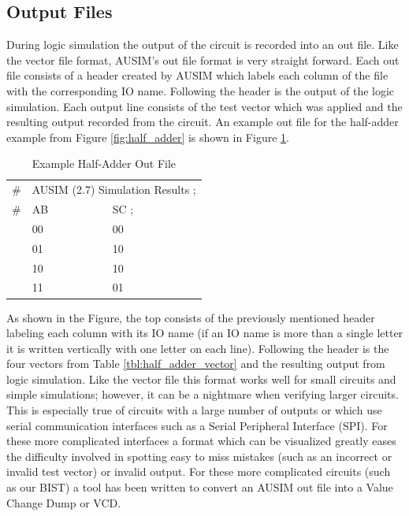 \documentclass[12pt]{report}
\begin{document}
\subsection{Output Files}
During logic simulation the output of the circuit is recorded into an out file.  Like the vector file format, AUSIM's out file format is very straight forward.  Each out file consists of a header created by AUSIM which labels each column of the file with the corresponding IO name.  Following the header is the output of the logic simulation.  Each output line consists of the test vector which was applied and the resulting output recorded from the circuit.  An example out file for the half-adder example from Figure \ref{fig:half_adder} is shown in Figure \ref{tbl:half_adder_out}.
\begin{table}
	\begin{center}
		\begin{tabular}{lll}
			\# & \multicolumn{2}{l}{AUSIM (2.7) Simulation Results ;} \\
			\# & AB & SC ; \\
			   & 00 & 00 \\
			   & 01 & 10 \\
			   & 10 & 10 \\
			   & 11 & 01 \\
		\end{tabular}
	\end{center}
	\caption{Example Half-Adder Out File}
	\label{tbl:half_adder_out}
\end{table}
As shown in the Figure, the top consists of the previously mentioned header labeling each column with its IO name (if an IO name is more than a single letter it is written vertically with one letter on each line).  Following the header is the four vectors from Table \ref{tbl:half_adder_vector} and the resulting output from logic simulation.  Like the vector file this format works well for small circuits and simple simulations; however, it can be a nightmare when verifying larger circuits.  This is especially true of circuits with a large number of outputs or which use serial communication interfaces such as a Serial Peripheral Interface (SPI).  For these more complicated interfaces a format which can be visualized greatly eases the difficulty involved in spotting easy to miss mistakes (such as an incorrect or invalid test vector) or invalid output.  For these more complicated circuits (such as our BIST) a tool has been written to convert an AUSIM out file into a Value Change Dump or VCD.
\end{document}
